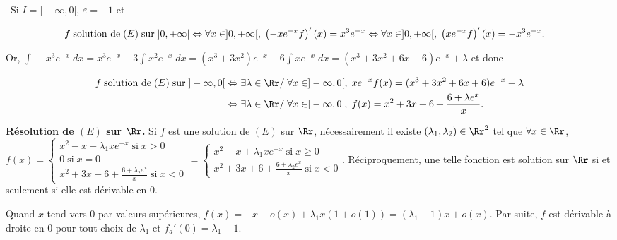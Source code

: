 {\begin{enumerate}
{\begin{center}
\shadowbox{
$\mathcal{S}_{]0,+\infty[}=\left\{x\mapsto x^2-x+\lambda xe^{-x},\;\lambda\in\Rr\right\}$.
}
\end{center}

\textbullet~Si $I=]-\infty,0[$, $\varepsilon=-1$ et 

\begin{align*}\ensuremath
f\;\text{solution de}\;(E)\;\text{sur}\;]0,+\infty[&\Leftrightarrow\forall x\in ]0,+\infty[,\;\left(-xe^{-x}f\right)'(x)=x^3e^{-x}
\Leftrightarrow\forall x\in ]0,+\infty[,\;\left(xe^{-x}f\right)'(x)=-x^3e^{-x}.
\end{align*}

Or, $\int_{}^{}-x^3e^{-x}\;dx=x^3e^{-x}-3\int_{}^{}x^2e^{-x}\;dx=(x^3+3x^2)e^{-x}-6\int_{}^{}xe^{-x}\;dx=(x^3+3x^2+6x+6)e^{-x}+\lambda$ et donc

\begin{align*}\ensuremath
f\;\text{solution de}\;(E)\;\text{sur}\;]-\infty,0[&\Leftrightarrow\exists\lambda\in\Rr/\;\forall x\in]-\infty,0[,\;xe^{-x}f(x)=(x^3+3x^2+6x+6)e^{-x}+\lambda\\
 &\Leftrightarrow\exists\lambda\in\Rr/\;\forall x\in]-\infty,0[,\;f(x)=x^2+3x+6+ \frac{6+\lambda e^x}{x}.
\end{align*}

\begin{center}
\shadowbox{
$\mathcal{S}_{]0,+\infty[}=\left\{x\mapsto x^2+3x+6+ \frac{6+\lambda e^x}{x},\;\lambda\in\Rr\right\}$.
}
\end{center}

\textbf{Résolution de $(E)$ sur $\Rr$.} Si $f$ est une solution de $(E)$ sur $\Rr$, nécessairement il existe $(\lambda_1,\lambda_2)\in\Rr^2$ tel que $\forall x\in\Rr$, $f(x)=\left\{
\begin{array}{l}
x^2-x+\lambda_1 xe^{-x}\;\text{si}\;x>0\\
0\;\text{si}\;x=0\\
x^2+3x+6+ \frac{6+\lambda_2 e^x}{x}\;\text{si}\;x<0
\end{array}
\right.=\left\{
\begin{array}{l}
x^2-x+\lambda_1 xe^{-x}\;\text{si}\;x\geqslant0\\
x^2+3x+6+ \frac{6+\lambda_2 e^x}{x}\;\text{si}\;x<0
\end{array}
\right.$. Réciproquement, une telle fonction est solution sur $\Rr$ si et seulement si elle est dérivable en $0$.

Quand $x$ tend vers $0$ par valeurs supérieures, $f(x)=-x+o(x)+\lambda_1 x(1+o(1))=(\lambda_1-1)x+o(x)$. Par suite, $f$ est dérivable à droite en $0$ pour tout choix de $\lambda_1$ et $f_d'(0)=\lambda_1-1$.

}
\end{enumerate}}
